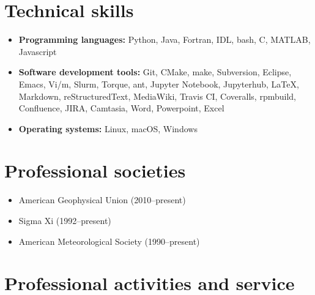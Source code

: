 \documentclass[letterpaper]{resume}
\begin{document}

\section{Technical skills}
\vspace{0.5em}

\begin{itemize}

  \item \textbf{Programming languages:}
    Python, Java, Fortran, IDL, bash, C, MATLAB, Javascript

  \item \textbf{Software development tools:}
    Git, CMake, make, Subversion, Eclipse, Emacs, Vi/m, Slurm, Torque,
    ant, Jupyter Notebook, Jupyterhub, \LaTeX, Markdown,
    reStructuredText, MediaWiki, Travis CI, Coveralls, rpmbuild,
    Confluence, JIRA, Camtasia, Word, Powerpoint, Excel

  \item \textbf{Operating systems:}
    Linux, macOS, Windows

\end{itemize}


\section{Professional societies}
\vspace{0.5em}

\begin{itemize}
  \item American Geophysical Union (2010--present) 
  \item Sigma Xi (1992--present)
  \item American Meteorological Society (1990--present)
\end{itemize}


\section{Professional activities and service}
\vspace{0.5em}
\end{document}
